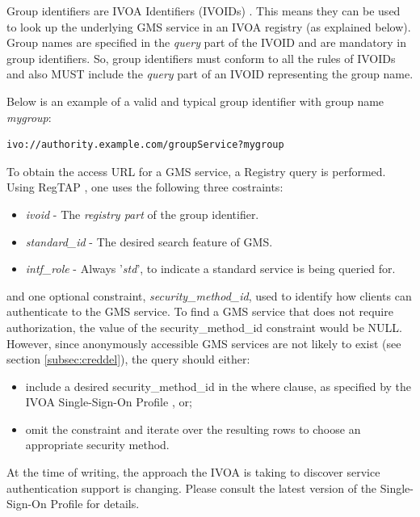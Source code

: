 \documentclass[11pt,a4paper]{ivoa}
\begin{document}
Group identifiers are IVOA Identifiers (IVOIDs) \citep{2016ivoa.spec.0523D}.  This means they can be used to look up the underlying GMS service in an IVOA registry (as explained below).  Group names are specified in the \emph{query} part of the IVOID and are mandatory in group identifiers.  So, group identifiers must conform to all the rules of IVOIDs and also MUST include the \emph{query} part of an IVOID representing the group name.

Below is an example of a valid and typical group identifier with group name \emph{mygroup}:

\begin{verbatim}
ivo://authority.example.com/groupService?mygroup
\end{verbatim}

To obtain the access URL for a GMS service, a Registry query is performed. Using RegTAP \citep{2014ivoa.spec.1208D}, one uses the following three costraints:

\begin{itemize}
\item{\emph{ivoid}} - The \emph{registry part} of the group identifier.
\item{\emph{standard\_id}} - The desired search feature of GMS.
\item{\emph{intf\_role}} - Always '\emph{std}', to indicate a standard service is being queried for.
\end{itemize}

and one optional constraint, \emph{security\_method\_id}, used to identify how clients can authenticate to the GMS service.  To find a GMS service that does not require authorization, the value of the security\_method\_id constraint would be NULL.  However, since anonymously accessible GMS services are not likely to exist (see section \ref{subsec:creddel}), the query should either:

\begin{itemize}
\item include a desired security\_method\_id in the where clause, as specified by the IVOA Single-Sign-On Profile \citep{2017ivoa.spec.0524T}, or;
\item omit the constraint and iterate over the resulting rows to choose an appropriate security method.
\end{itemize}

At the time of writing, the approach the IVOA is taking to discover service authentication support is changing.  Please consult the latest version of the Single-Sign-On Profile for details.
\end{document}
